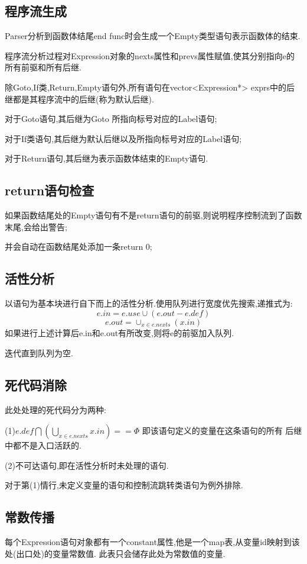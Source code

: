 \documentclass[UTF8]{article}
\begin{document}
\subsection{程序流生成}
Parser分析到函数体结尾end func时会生成一个Empty类型语句表示函数体的结束.

程序流分析过程对Expression对象的nexts属性和prevs属性赋值,使其分别指向e的所有前驱和所有后继.

除Goto,If类,Return,Empty语句外,所有语句在vector<Expression*> exprs中的后继都是其程序流中的后继(称为默认后继).

对于Goto语句,其后继为Goto 所指向标号对应的Label语句;

对于If类语句,其后继为默认后继以及所指向标号对应的Label语句;

对于Return语句,其后继为表示函数体结束的Empty语句.

\subsection{return语句检查}
如果函数结尾处的Empty语句有不是return语句的前驱,则说明程序控制流到了函数末尾,会给出警告;

并会自动在函数结尾处添加一条return 0;
\subsection{活性分析}
以语句为基本块进行自下而上的活性分析.使用队列进行宽度优先搜索,递推式为:
$$e.in = e.use\cup (e.out - e.def)$$
$$e.out = \cup_{x\in e.nexts} (x.in)$$
如果进行上述计算后e.in和e.out有所改变,则将e的前驱加入队列.

迭代直到队列为空.

\subsection{死代码消除}
此处处理的死代码分为两种:

(1)$e.def \bigcap\left( \bigcup_{x\in e.nexts}x.in \right)== \Phi$ 即该语句定义的变量在这条语句的所有
后继中都不是入口活跃的.

(2)不可达语句,即在活性分析时未处理的语句.

对于第(1)情行,未定义变量的语句和控制流跳转类语句为例外排除.

\subsection{常数传播}
每个Expression语句对象都有一个constant属性,他是一个map表,从变量id映射到该处(出口处)的变量常数值. 此表只会储存此处为常数值的变量.
\end{document}

